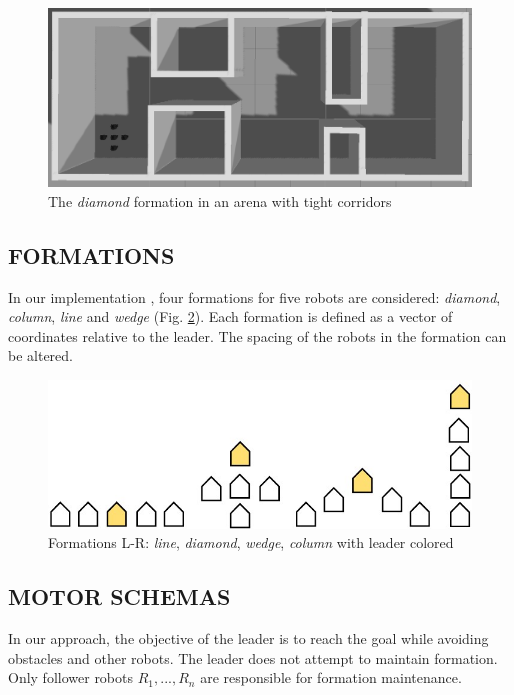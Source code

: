 \documentclass[letterpaper, 10 pt, conference]{ieeeconf}  %
\begin{document}
\begin{figure}[thpb]
\centering
\includegraphics[width=\linewidth]{images/corridorworld.png}
\caption{The \textit{diamond} formation in an arena with tight corridors}
\label{corridorworld}
\end{figure}

\subsection{FORMATIONS}

In our implementation \cite{repository}, four formations for five robots are considered: \textit{diamond}, \textit{column}, \textit{line} and \textit{wedge} (Fig. \ref{formation_shapes}). Each formation is defined as a vector of coordinates relative to the leader. The spacing of the robots in the formation can be altered. 

\begin{figure}[thpb]
\centering
\includegraphics[width=0.7\linewidth]{images/formation_shapes.jpg}
\caption{Formations L-R: \textit{line}, \textit{diamond}, \textit{wedge}, \textit{column} with leader colored}
\label{formation_shapes}
\end{figure}

\subsection{MOTOR SCHEMAS}

In our approach, the objective of the leader is to reach the goal while avoiding obstacles and other robots. The leader does not attempt to maintain formation. Only follower robots $R_1,...,R_n$ are responsible for formation maintenance. 
\end{document}
